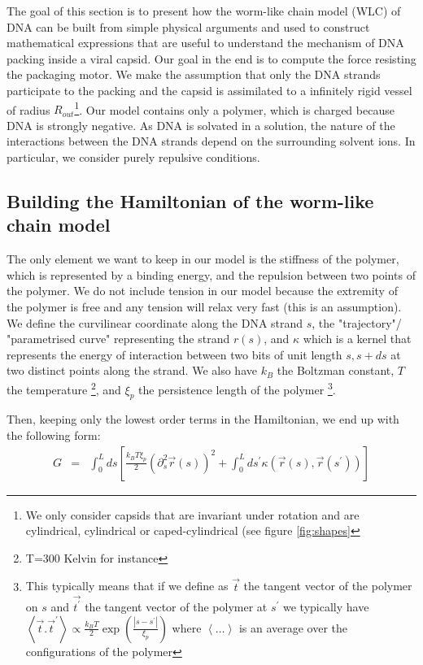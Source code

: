 \documentclass{article}
\begin{document}
The goal of this section is to present how the worm-like chain model (WLC) of DNA can be built from simple physical arguments and used to construct mathematical expressions that are useful to understand the mechanism of DNA packing inside a viral capsid. Our goal in the end is to compute the force resisting the packaging motor. We make the assumption that only the DNA strands participate to the packing and the capsid is assimilated to a infinitely rigid vessel of radius $ R_{out} $\footnote{We only consider capsids that are invariant under rotation and are cylindrical, cylindrical or caped-cylindrical (see figure \ref{fig:shapes}}. Our model contains only a polymer, which is charged because DNA is strongly negative. As DNA is solvated in a solution, the nature of the interactions between the DNA strands depend on the surrounding solvent ions.\cite{purohit2003} In particular, we consider purely repulsive conditions. 

\subsection{Building the Hamiltonian of the worm-like chain model}
The only element we want to keep in our model is the stiffness of the polymer, which is represented by a binding energy, and the repulsion between two points of the polymer. We do not include tension in our model because the extremity of the polymer is free and any tension will relax very fast (this is an assumption). We define the curvilinear coordinate along the DNA strand $s$, the "trajectory"/ "parametrised curve" representing the strand $r(s)$, and $\kappa$ which is a kernel that represents the energy of interaction between two bits of unit length $s, s+ds$ at two distinct points along the strand. We also have $k_B$ the Boltzman constant, $T$ the temperature \footnote{T=300 Kelvin for instance}, and $\xi_p$ the persistence length of the polymer \footnote{This typically means that if we define as $\vec{t}$ the tangent vector of the polymer on $s$ and $\vec{t^\prime}$ the tangent vector of the polymer at $ s^\prime $ we typically have $\left\langle \vec{t} . \vec{t}^\prime \right\rangle \propto \frac{k_B T}{2} \exp{ \left( \frac{\left\vert s-s^\prime\right\vert }{\xi_p} \right )}$ where $\left\langle \dots \right\rangle $ is an average over the configurations of the polymer}.

Then, keeping only the lowest order terms in the Hamiltonian, we end up with the following form:
\begin{eqnarray*}
    G &=& \int_{0}^{L} ds \left[ \frac{k_B T \xi_p}{2} \left( \partial_s^2 \vec{r}(s) \right)^2 + \int_0^L ds^\prime \kappa \left(\vec{r}(s), \vec{r}(s^\prime) \right) \right]
\end{eqnarray*}
\end{document}
